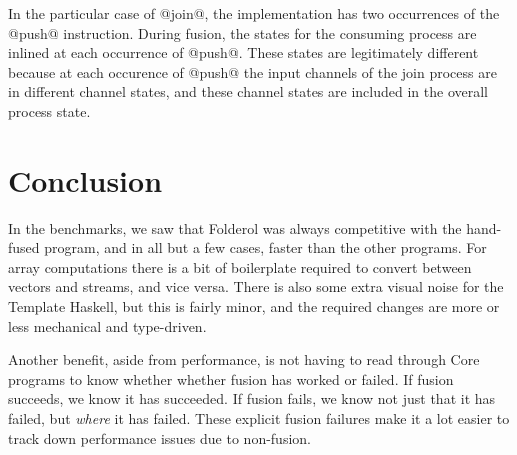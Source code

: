 In the particular case of @join@, the implementation has two occurrences of the @push@ instruction. During fusion, the states for the consuming process are inlined at each occurrence of @push@. These states are legitimately different because at each occurence of @push@ the input channels of the join process are in different channel states, and these channel states are included in the overall process state.


\section{Conclusion}
In the benchmarks, we saw that Folderol was always competitive with the hand-fused program, and in all but a few cases, faster than the other programs.
For array computations there is a bit of boilerplate required to convert between vectors and streams, and vice versa.
There is also some extra visual noise for the Template Haskell, but this is fairly minor, and the required changes are more or less mechanical and type-driven.

Another benefit, aside from performance, is not having to read through Core programs to know whether whether fusion has worked or failed.
If fusion succeeds, we know it has succeeded.
If fusion fails, we know not just that it has failed, but \emph{where} it has failed.
These explicit fusion failures make it a lot easier to track down performance issues due to non-fusion.

